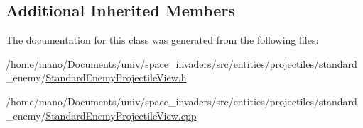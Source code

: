 \subsection*{Additional Inherited Members}


The documentation for this class was generated from the following files\+:\begin{DoxyCompactItemize}
\item 
/home/mano/\+Documents/univ/space\+\_\+invaders/src/entities/projectiles/standard\+\_\+enemy/\hyperlink{StandardEnemyProjectileView_8h}{Standard\+Enemy\+Projectile\+View.\+h}\item 
/home/mano/\+Documents/univ/space\+\_\+invaders/src/entities/projectiles/standard\+\_\+enemy/\hyperlink{StandardEnemyProjectileView_8cpp}{Standard\+Enemy\+Projectile\+View.\+cpp}\end{DoxyCompactItemize}
